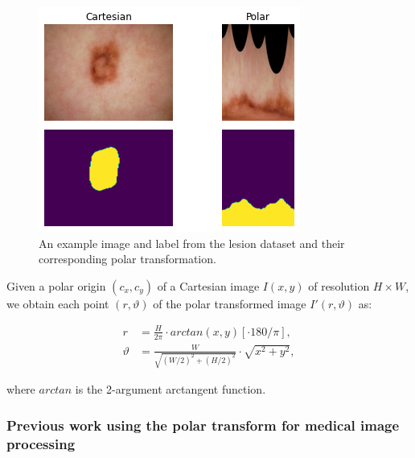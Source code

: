 	\begin{figure}[h]
		\centering
		\includegraphics[width=0.4\linewidth]{images/4/to_polar}
		\caption{An example image and label from the lesion dataset and their corresponding polar transformation. \cite{bencevicTrainingPolarImage2021}}
		\label{fig:polar-lesion}
	\end{figure}

Given a polar origin $(c_x, c_y)$ of a Cartesian image $I(x, y)$ of resolution $H \times W$, we obtain each point $(r, \vartheta)$ of the polar transformed image $I'(r, \vartheta)$ as:

  \begin{equation}
    \begin{aligned}
      r &= \frac{H}{2 \pi} \cdot arctan(x, y) [ \cdot 180 / \pi ], \\
      \vartheta &= \frac{W}{\sqrt{(W / 2)^2 + (H / 2)^2}} \cdot \sqrt{x^2 + y^2},
    \end{aligned}
    \label{eq:polar-transform}
  \end{equation}
  
  where $arctan$ is the 2-argument arctangent function.

    \subsubsection{Previous work using the polar transform for medical image processing}
    

